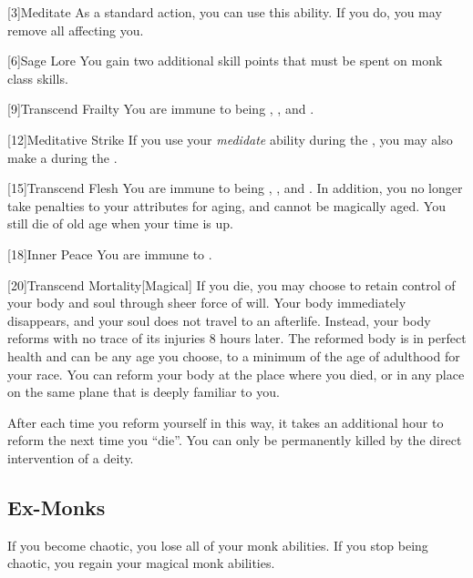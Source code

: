             [3]{Meditate} As a standard action, you can use this ability.
            If you do, you may remove all  affecting you.

            [6]{Sage Lore} You gain two additional skill points that must be spent on monk class skills.

            [9]{Transcend Frailty}
            You are immune to being , , and .

            [12]{Meditative Strike} If you use your \textit{medidate} ability during the , you may also make a  during the .

            [15]{Transcend Flesh}
            You are immune to being , , and .
            In addition, you no longer take penalties to your attributes for aging, and cannot be magically aged.
            You still die of old age when your time is up.

            [18]{Inner Peace}
            You are immune to  .

            [20]{Transcend Mortality}[Magical]
            If you die, you may choose to retain control of your body and soul through sheer force of will.
            Your body immediately disappears, and your soul does not travel to an afterlife.
            Instead, your body reforms with no trace of its injuries 8 hours later.
            The reformed body is in perfect health and can be any age you choose, to a minimum of the age of adulthood for your race.
            You can reform your body at the place where you died, or in any place on the same plane that is deeply familiar to you.

            After each time you reform yourself in this way, it takes an additional hour to reform the next time you ``die''.
            You can only be permanently killed by the direct intervention of a deity.

        \subsection{Ex-Monks}
            If you become chaotic, you lose all of your  monk abilities.
            If you stop being chaotic, you regain your magical monk abilities.

